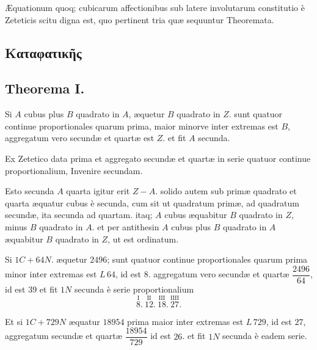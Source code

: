 \documentclass[11pt,a4paper]{article}
\begin{document}
Æquationum quoq; cubicarum affectionibus sub latere involutarum constitutio è Zeteticis scitu digna est, quo pertinent tria quæ sequuntur Theoremata.

\subsection*{Καταφατικῆς}

\subsection*{Theorema I.}

Si $A$ cubus plus $B$ quadrato in $A$, æquetur $B$ quadrato in $Z$. sunt quatuor continue proportionales quarum prima, maior minorve inter extremas est $B$, aggregatum vero secundæ et quartæ est $Z$. et fit $A$ secunda.

Ex Zetetico data prima et aggregato secundæ et quartæ in serie quatuor continue proportionalium, Invenire secundam.

Esto secunda $A$ quarta igitur erit $Z - A$. solido autem sub primæ quadrato et quarta æquatur cubus è secunda, cum sit ut quadratum primæ, ad quadratum secundæ, ita secunda ad quartam. itaq; $A$ cubus æquabitur $B$ quadrato in $Z$, minus $B$ quadrato in $A$. et per antithesin $A$ cubus plus $B$ quadrato in $A$ æquabitur $B$ quadrato in $Z$, ut est ordinatum.


Si $1C + 64N.$ æquetur $2496$; sunt quatuor continue proportionales quarum prima minor inter extremas est $L\,64$, id est $8$. aggregatum vero secundæ et quartæ $\dfrac{2496}{64}$, id est $39$ et fit $1N$ secunda è serie proportionalium
\[ \overset{\mathrm{I}}{8}.\ \overset{\mathrm{II}}{12}.\ \overset{\mathrm{III}}{18}.\ \overset{\mathrm{IIII}}{27}. \]

Et si $1C + 729N$ æquatur $18954$ prima maior inter extremas est $L\,729$, id est $27$, aggregatum secundæ et quartæ $\dfrac{18954}{729}$ id est $26$. et fit  $1N$ secunda è eadem serie.
\end{document}
